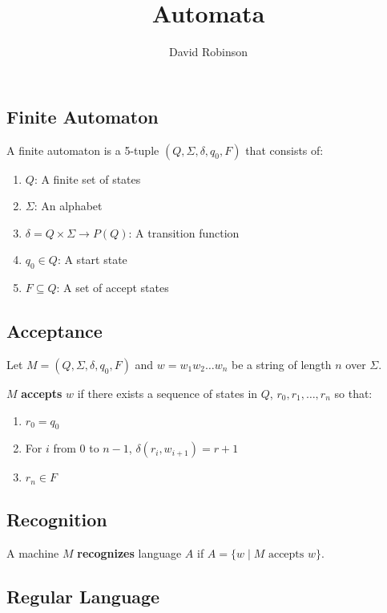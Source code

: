 \documentclass{article}
\title{Automata}
\author{David Robinson}
\date{}
\begin{document}
\maketitle

\subsection*{Finite Automaton}

A finite automaton is a 5-tuple $(Q, \Sigma, \delta, q_0, F)$ that consists of:
\begin{enumerate}
    \item $Q$: A finite set of states
    \item $\Sigma$: An alphabet
    \item $\delta=Q\times \Sigma\rightarrow P(Q)$: A transition function
    \item $q_0 \in Q$: A start state
    \item $F \subseteq Q$: A set of accept states
\end{enumerate}

\subsection*{Acceptance}

Let $M=(Q,\Sigma, \delta, q_0, F)$ and $w=w_1 w_2 \ldots w_n$ be a string of length $n$ over $\Sigma$.
\vspace{1em}

$M$ \textbf{accepts} $w$ if there exists a sequence of states in $Q$, $r_0, r_1, \ldots, r_n$ so that:
\begin{enumerate}
    \item $r_0=q_0$
    \item For $i$ from $0$ to $n-1$, $\delta(r_i, w_{i+1})=r+1$
    \item $r_n \in F$
\end{enumerate}

\subsection*{Recognition}

A machine $M$ \textbf{recognizes} language $A$ if $A=\{w \mid M \text{ accepts } w\}$.

\subsection*{Regular Language}
\end{document}
